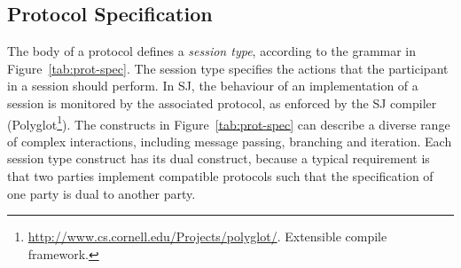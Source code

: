 \documentclass{llncs}
\begin{document}

\subsection{Protocol Specification}

The body of a protocol defines a \textit{session type}, according to the grammar in Figure~\ref{tab:prot-spec}.
The session type specifies the actions that the participant in a session should perform. In SJ, the behaviour of an implementation of a session is monitored by the associated protocol, as enforced by the SJ compiler (Polyglot\footnote{\url{http://www.cs.cornell.edu/Projects/polyglot/}. Extensible compile framework.}). The constructs in Figure~\ref{tab:prot-spec} can describe a diverse range of complex interactions, including message passing, branching and iteration. Each session type construct has its dual construct, because a typical requirement is that two parties implement compatible protocols such that the specification of one party is dual to another party.
\end{document}
